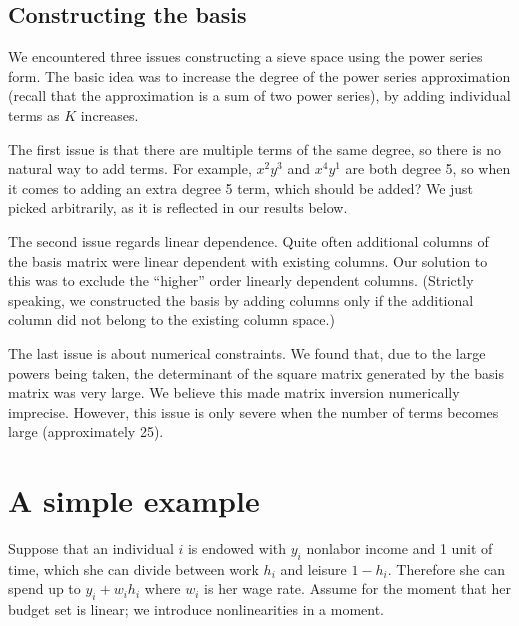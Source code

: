 \documentclass[11pt,letterpaper]{article}                  %
\begin{document}
\subsection{Constructing the basis}

We encountered three issues constructing a sieve space using the power series form.
The basic idea was to increase the degree of the power series approximation (recall that the approximation is a sum of two power series), by adding individual terms as $K$ increases.

The first issue is that there are multiple terms of the same degree, so there is no natural way to add terms.
For example, $x^2y^3$ and $x^4y^1$ are both degree 5, so when it comes to adding an extra degree 5 term, which should be added?
We just picked arbitrarily, as it is reflected in our results below.

The second issue regards linear dependence.
Quite often additional columns of the basis matrix were linear dependent with existing columns.
Our solution to this was to exclude the ``higher'' order linearly dependent columns.
(Strictly speaking, we constructed the basis by adding columns only if the additional column did not belong to the existing column space.)

The last issue is about numerical constraints.
We found that, due to the large powers being taken, the determinant of the square matrix generated by the basis matrix was very large.
We believe this made matrix inversion numerically imprecise.
However, this issue is only severe when the number of terms becomes large (approximately 25).



\section{A simple example}
\label{sec:ex1}

Suppose that an individual $i$ is endowed with $y_i$ nonlabor income and 1 unit of time, which she can divide between work $h_i$ and leisure $1-h_i$.
Therefore she can spend up to $y_i + w_i h_i$ where $w_i$ is her wage rate.
Assume for the moment that her budget set is linear; we introduce nonlinearities in a moment.
\end{document}
